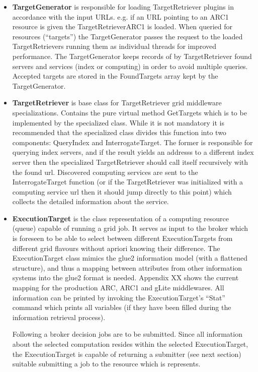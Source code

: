 \documentclass{book}
\begin{document}
\begin{itemize}
\item{{\bf TargetGenerator} is responsible for loading TargetRetriever plugins in accordance with the input URLs. 
e.g. if an URL pointing to an ARC1 resource is given the TargetRetrieverARC1 is loaded. When queried for resources 
(``targets'') the TargetGenerator passes the request to the loaded TargetRetrievers running them as individual threads 
for improved performance. The TargetGenerator keeps records of by TargetRetriever found servers and services 
(index or computing) in order to avoid multiple queries. Accepted targets are stored in the FoundTargets array kept by 
the TargetGenerator.}

\item{{\bf TargetRetriever} is base class for TargetRetriever grid middleware specializations. Contains the pure 
virtual method GetTargets which is to be implemented by the specialized class. While it is not mandatory it is recommended 
that the specialized class divides this function into two components: QueryIndex and InterrogateTarget. The former is 
responsible for querying index servers, and if the result yields an addresss to a different index server then the 
specialized TargetRetriever should call itself recursively with the found url. Discovered computing services are sent 
to the InterrogateTarget function (or if the TargetRetriever was initialized with a computing service url then it should 
jump directly to this point) which collects the detailed information about the service.}

\item{{\bf ExecutionTarget} is the class representation of a computing resource (queue) capable of running a grid job. It
serves as input to the broker which is foreseen to be able to select between different ExecutionTargets from different 
grid flavours without apriori knowing their difference. The ExecutionTarget class mimics the glue2 information model (with 
a flattened structure), and thus a mapping between attributes from other information systems into the glue2 format is needed. 
Appendix XX shows the current mapping for the production ARC, ARC1 and gLite middlewares. All information can be printed by 
invoking the ExecutionTarget's ``Stat'' command which prints all variables (if they have been filled during the information 
retrieval process).

Following a broker decision jobs are to be submitted. Since all information about the selected computation resides within the 
selected ExecutionTarget, the ExecutionTarget is capable of returning a submitter (see next section) suitable submitting a 
job to the resource which is represents.}
\end{itemize}
\end{document}
